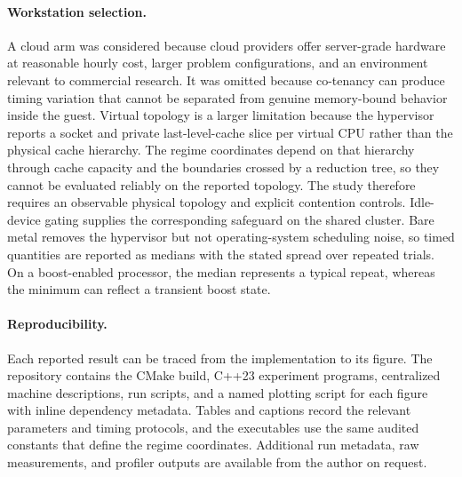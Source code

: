 \paragraph{Workstation selection.} A cloud arm was considered because cloud providers offer server-grade hardware at reasonable hourly cost, larger problem configurations, and an environment relevant to commercial research. It was omitted because co-tenancy can produce timing variation that cannot be separated from genuine memory-bound behavior inside the guest. Virtual topology is a larger limitation because the hypervisor reports a socket and private last-level-cache slice per virtual CPU rather than the physical cache hierarchy. The regime coordinates depend on that hierarchy through cache capacity and the boundaries crossed by a reduction tree, so they cannot be evaluated reliably on the reported topology. The study therefore requires an observable physical topology and explicit contention controls. Idle-device gating supplies the corresponding safeguard on the shared cluster. Bare metal removes the hypervisor but not operating-system scheduling noise, so timed quantities are reported as medians with the stated spread over repeated trials. On a boost-enabled processor, the median represents a typical repeat, whereas the minimum can reflect a transient boost state.

\paragraph{Reproducibility.} Each reported result can be traced from the implementation to its figure. The repository contains the CMake build, C++23 experiment programs, centralized machine descriptions, run scripts, and a named plotting script for each figure with inline dependency metadata. Tables and captions record the relevant parameters and timing protocols, and the executables use the same audited constants that define the regime coordinates. Additional run metadata, raw measurements, and profiler outputs are available from the author on request.
